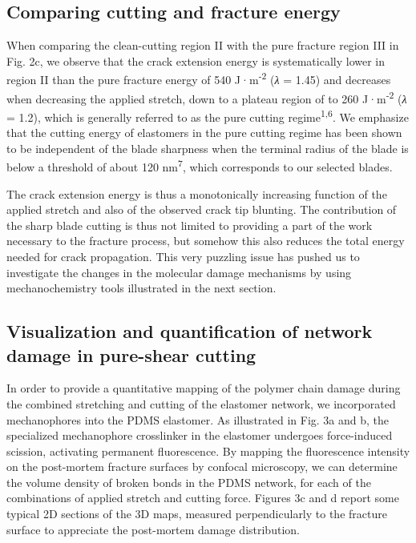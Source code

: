\documentclass{article}
\begin{document}
\subsection*{Comparing cutting and fracture energy}

When comparing the clean-cutting region II with the pure fracture region III in Fig. 2c, we observe that the crack extension energy is systematically lower in region II than the pure fracture energy of 540 J·m\textsuperscript{-2} (\emph{λ} = 1.45) and decreases when decreasing the applied stretch, down to a plateau region of to 260 J·m\textsuperscript{-2} (\emph{λ} = 1.2), which is generally referred to as the pure cutting regime\textsuperscript{1,6}. We emphasize that the cutting energy of elastomers in the pure cutting regime has been shown to be independent of the blade sharpness when the terminal radius of the blade is below a threshold of about 120 nm\textsuperscript{7}, which corresponds to our selected blades.

The crack extension energy is thus a monotonically increasing function of the applied stretch and also of the observed crack tip blunting. The contribution of the sharp blade cutting is thus not limited to providing a part of the work necessary to the fracture process, but somehow this also reduces the total energy needed for crack propagation. This very puzzling issue has pushed us to investigate the changes in the molecular damage mechanisms by using mechanochemistry tools illustrated in the next section.

\subsection*{Visualization and quantification of network damage in pure-shear cutting}

In order to provide a quantitative mapping of the polymer chain damage during the combined stretching and cutting of the elastomer network, we incorporated mechanophores into the PDMS elastomer. As illustrated in Fig. 3a and b, the specialized mechanophore crosslinker in the elastomer undergoes force-induced scission, activating permanent fluorescence. By mapping the fluorescence intensity on the post-mortem fracture surfaces by confocal microscopy, we can determine the volume density of broken bonds in the PDMS network, for each of the combinations of applied stretch and cutting force. Figures 3c and d report some typical 2D sections of the 3D maps, measured perpendicularly to the fracture surface to appreciate the post-mortem damage distribution.
\end{document}
